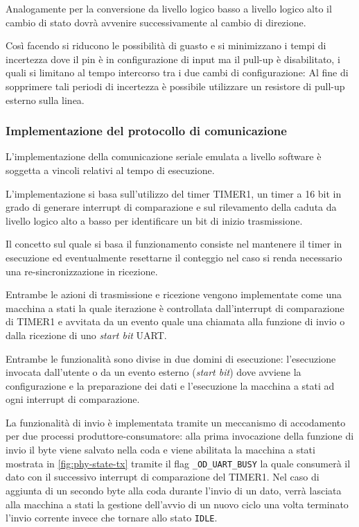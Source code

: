 Analogamente per la conversione da livello logico basso a livello logico alto il cambio di stato dovrà avvenire successivamente al cambio di direzione.

Così facendo si riducono le possibilità di guasto e si minimizzano i tempi di incertezza dove il pin è in configurazione di input ma il pull-up è disabilitato, i quali si limitano al tempo intercorso tra i due cambi di configurazione: Al fine di sopprimere tali periodi di incertezza è possibile utilizzare un resistore di pull-up esterno sulla linea.

\subsubsection{Implementazione del protocollo di comunicazione}

L'implementazione della comunicazione seriale emulata a livello software è soggetta a vincoli relativi al tempo di esecuzione.

L'implementazione si basa sull'utilizzo del timer TIMER1, un timer a 16 bit in grado di generare interrupt di comparazione e sul rilevamento della caduta da livello logico alto a basso per identificare un bit di inizio trasmissione.

Il concetto sul quale si basa il funzionamento consiste nel mantenere il timer in esecuzione ed eventualmente resettarne il conteggio nel caso si renda necessario una re-sincronizzazione in ricezione.

Entrambe le azioni di trasmissione e ricezione vengono implementate come una macchina a stati la quale iterazione è controllata dall'interrupt di comparazione di TIMER1 e avvitata da un evento quale una chiamata alla funzione di invio o dalla ricezione di uno \textit{start bit} UART.\@

Entrambe le funzionalità sono divise in due domini di esecuzione: l'esecuzione invocata dall'utente o da un evento esterno (\textit{start bit}) dove avviene la configurazione e la preparazione dei dati e l'esecuzione la macchina a stati ad ogni interrupt di comparazione. 

La funzionalità di invio è implementata tramite un meccanismo di accodamento per due processi produttore-consumatore: alla prima invocazione della funzione di invio il byte viene salvato nella coda e viene abilitata la macchina a stati mostrata in \cref{fig:phy-state-tx} tramite il flag \texttt{\_OD\_UART\_BUSY} la quale consumerà il dato con il successivo interrupt di comparazione del TIMER1.
Nel caso di aggiunta di un secondo byte alla coda durante l'invio di un dato, verrà lasciata alla macchina a stati la gestione dell'avvio di un nuovo ciclo una volta terminato l'invio corrente invece che tornare allo stato \texttt{IDLE}. 

